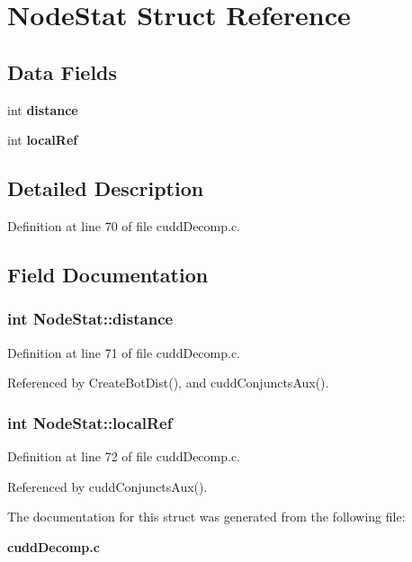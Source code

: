 \section{Node\-Stat Struct Reference}
\label{structNodeStat}
\subsection*{Data Fields}
\begin{CompactItemize}
\item 
int \bf{distance}
\item 
int \bf{local\-Ref}
\end{CompactItemize}


\subsection{Detailed Description}




Definition at line 70 of file cudd\-Decomp.c.

\subsection{Field Documentation}
\subsubsection{\setlength{\rightskip}{0pt plus 5cm}int \bf{Node\-Stat::distance}}\label{structNodeStat_3546a3ffc08e9e62391ea04e3ad7de57}




Definition at line 71 of file cudd\-Decomp.c.

Referenced by Create\-Bot\-Dist(), and cudd\-Conjuncts\-Aux().
\subsubsection{\setlength{\rightskip}{0pt plus 5cm}int \bf{Node\-Stat::local\-Ref}}\label{structNodeStat_6e8e33277e17fcf940685260d82f63cd}




Definition at line 72 of file cudd\-Decomp.c.

Referenced by cudd\-Conjuncts\-Aux().

The documentation for this struct was generated from the following file:\begin{CompactItemize}
\item 
\bf{cudd\-Decomp.c}\end{CompactItemize}
